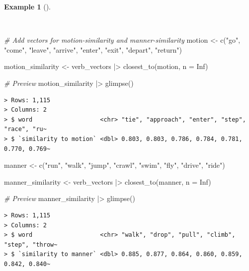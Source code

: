 \documentclass[
  letterpaper,
  DIV=11,
  numbers=noendperiod]{scrreprt}
\newenvironment{Shaded}{\begin{snugshade}}{\end{snugshade}}
\newcommand{\AttributeTok}[1]{\textcolor[rgb]{0.00,0.00,0.00}{#1}}
\newcommand{\CommentTok}[1]{\textcolor[rgb]{0.00,0.00,0.00}{\textit{#1}}}
\newcommand{\ConstantTok}[1]{\textcolor[rgb]{0.00,0.00,0.00}{#1}}
\newcommand{\FunctionTok}[1]{\textcolor[rgb]{0.00,0.00,0.00}{#1}}
\newcommand{\NormalTok}[1]{\textcolor[rgb]{0.00,0.00,0.00}{#1}}
\newcommand{\OtherTok}[1]{\textcolor[rgb]{0.00,0.00,0.00}{#1}}
\newcommand{\SpecialCharTok}[1]{\textcolor[rgb]{0.00,0.00,0.00}{#1}}
\newcommand{\StringTok}[1]{\textcolor[rgb]{0.00,0.00,0.00}{#1}}
\theoremstyle{definition}
\newtheorem{example}{Example}[chapter]
\theoremstyle{remark}
\begin{document}
\begin{example}[]\protect\hypertarget{exm-eda-masc-vsm-word2vec-manner-motion}{}\label{exm-eda-masc-vsm-word2vec-manner-motion}

~

\begin{Shaded}
\begin{Highlighting}[]
\CommentTok{\# Add vectors for motion{-}similarity and manner{-}similarity}
\NormalTok{motion }\OtherTok{\textless{}{-}}
  \FunctionTok{c}\NormalTok{(}\StringTok{"go"}\NormalTok{, }\StringTok{"come"}\NormalTok{, }\StringTok{"leave"}\NormalTok{, }\StringTok{"arrive"}\NormalTok{, }\StringTok{"enter"}\NormalTok{, }\StringTok{"exit"}\NormalTok{, }\StringTok{"depart"}\NormalTok{, }\StringTok{"return"}\NormalTok{)}

\NormalTok{motion\_similarity }\OtherTok{\textless{}{-}}
\NormalTok{  verb\_vectors }\SpecialCharTok{|\textgreater{}} \FunctionTok{closest\_to}\NormalTok{(motion, }\AttributeTok{n =} \ConstantTok{Inf}\NormalTok{)}

\CommentTok{\# Preview}
\NormalTok{motion\_similarity }\SpecialCharTok{|\textgreater{}} \FunctionTok{glimpse}\NormalTok{()}
\end{Highlighting}
\end{Shaded}

\begin{verbatim}
> Rows: 1,115
> Columns: 2
> $ word                   <chr> "tie", "approach", "enter", "step", "race", "ru~
> $ `similarity to motion` <dbl> 0.803, 0.803, 0.786, 0.784, 0.781, 0.770, 0.769~
\end{verbatim}

\begin{Shaded}
\begin{Highlighting}[]
\NormalTok{manner }\OtherTok{\textless{}{-}}
  \FunctionTok{c}\NormalTok{(}\StringTok{"run"}\NormalTok{, }\StringTok{"walk"}\NormalTok{, }\StringTok{"jump"}\NormalTok{, }\StringTok{"crawl"}\NormalTok{, }\StringTok{"swim"}\NormalTok{, }\StringTok{"fly"}\NormalTok{, }\StringTok{"drive"}\NormalTok{, }\StringTok{"ride"}\NormalTok{)}

\NormalTok{manner\_similarity }\OtherTok{\textless{}{-}}
\NormalTok{  verb\_vectors }\SpecialCharTok{|\textgreater{}} \FunctionTok{closest\_to}\NormalTok{(manner, }\AttributeTok{n =} \ConstantTok{Inf}\NormalTok{)}

\CommentTok{\# Preview}
\NormalTok{manner\_similarity }\SpecialCharTok{|\textgreater{}} \FunctionTok{glimpse}\NormalTok{()}
\end{Highlighting}
\end{Shaded}

\begin{verbatim}
> Rows: 1,115
> Columns: 2
> $ word                   <chr> "walk", "drop", "pull", "climb", "step", "throw~
> $ `similarity to manner` <dbl> 0.885, 0.877, 0.864, 0.860, 0.859, 0.842, 0.840~
\end{verbatim}

\end{example}
\end{document}
